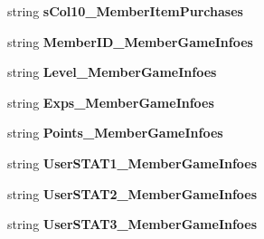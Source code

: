 \begin{DoxyCompactItemize}
\item 
string {\bfseries s\+Col10\+\_\+\+Member\+Item\+Purchases}\hypertarget{a00118_a139645545e267fe5f0fb36a68c4ba0b7}{}\label{a00118_a139645545e267fe5f0fb36a68c4ba0b7}

\item 
string {\bfseries Member\+I\+D\+\_\+\+Member\+Game\+Infoes}\hypertarget{a00118_ae17403919b104b08b1c03f2234389f54}{}\label{a00118_ae17403919b104b08b1c03f2234389f54}

\item 
string {\bfseries Level\+\_\+\+Member\+Game\+Infoes}\hypertarget{a00118_a3d2478e42761eb8371c918b49cd357fb}{}\label{a00118_a3d2478e42761eb8371c918b49cd357fb}

\item 
string {\bfseries Exps\+\_\+\+Member\+Game\+Infoes}\hypertarget{a00118_a64901241a892a598528f8bf04a944a57}{}\label{a00118_a64901241a892a598528f8bf04a944a57}

\item 
string {\bfseries Points\+\_\+\+Member\+Game\+Infoes}\hypertarget{a00118_ab550dc4d178535f9421df1ea4e14cb7e}{}\label{a00118_ab550dc4d178535f9421df1ea4e14cb7e}

\item 
string {\bfseries User\+S\+T\+A\+T1\+\_\+\+Member\+Game\+Infoes}\hypertarget{a00118_a401aa66d365195397115e1a1b13b568a}{}\label{a00118_a401aa66d365195397115e1a1b13b568a}

\item 
string {\bfseries User\+S\+T\+A\+T2\+\_\+\+Member\+Game\+Infoes}\hypertarget{a00118_a3a21128aed6a44a3d83dd8e5b2bf3ced}{}\label{a00118_a3a21128aed6a44a3d83dd8e5b2bf3ced}

\item 
string {\bfseries User\+S\+T\+A\+T3\+\_\+\+Member\+Game\+Infoes}\hypertarget{a00118_afd7510e9018b7b92c5d4b18a04a9687d}{}\label{a00118_afd7510e9018b7b92c5d4b18a04a9687d}


\end{DoxyCompactItemize}
